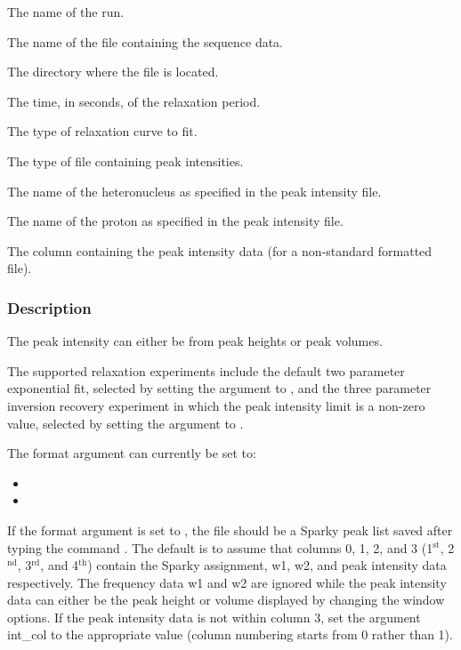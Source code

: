   The name of the run.

  The name of the file containing the sequence  data.

  The directory where the file is located.

  The time, in seconds, of the relaxation  period.

  The type of relaxation  curve to fit.

  The type of file containing peak intensities.

  The name of the heteronucleus as specified in the peak intensity file.

  The name of the proton as specified in the peak intensity file.

  The column containing the peak intensity data (for a non-standard formatted file).

\subsubsection{Description}

The peak intensity can either be from peak heights or peak volumes.


The supported relaxation  experiments include the default two parameter exponential fit,
selected by setting the 
 argument to 
, and the three parameter inversion
recovery experiment in which the peak intensity limit  is a non-zero value, selected by
setting the argument to 
.


The format argument can currently be set to:
\begin{itemize}
\item[]     
\item[]     
\end{itemize}

If the format argument is set to 
, the file should be a Sparky  peak list saved after
typing the command 
.  The default is to assume that columns 0, 1, 2, and 3 (1$^\mathrm{st}$, 2$^\mathrm{nd}$,
3$^\mathrm{rd}$, and 4$^\mathrm{th}$) contain the Sparky  assignment, w1, w2, and peak intensity data respectively.
The frequency data w1 and w2 are ignored while the peak intensity data can either be the
peak height or volume displayed  by changing the window options.  If the peak intensity data
is not within column 3, set the argument int\_col to the appropriate value (column numbering
starts from 0 rather than 1).

